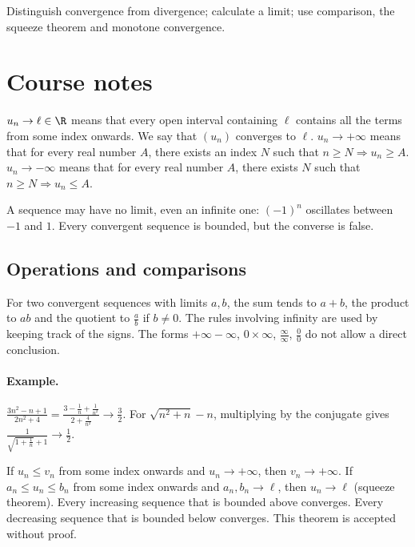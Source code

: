 \label{ch:2}


\begin{keypoint}[Objectives]Distinguish convergence from divergence; calculate a limit; use comparison, the squeeze theorem and monotone convergence.\end{keypoint}

\section{Course notes}
\begin{keypoint}[Definitions]
$u_n\to\ell\in\R$ means that every open interval containing $\ell$ contains all the terms from some index onwards. We say that $(u_n)$ converges to $\ell$.
$u_n\to+\infty$ means that for every real number $A$, there exists an index $N$ such that $n\ge N\Rightarrow u_n\ge A$. $u_n\to-\infty$ means that for every real number $A$, there exists $N$ such that $n\ge N\Rightarrow u_n\le A$.
\end{keypoint}
A sequence may have no limit, even an infinite one: $(-1)^n$ oscillates between $-1$ and $1$. Every convergent sequence is bounded, but the converse is false.
\subsection{Operations and comparisons}
For two convergent sequences with limits $a,b$, the sum tends to $a+b$, the product to $ab$ and the quotient to $\frac{a}{b}$ if $b\ne0$. The rules involving infinity are used by keeping track of the signs. The forms $+\infty-\infty$, $0\times\infty$, $\frac{\infty}{\infty}$, $\frac{0}{0}$ do not allow a direct conclusion.
\paragraph{Example.} $\frac{3n^2-n+1}{2n^2+4}=\frac{3-\frac{1}{n}+\frac{1}{n^2}}{2+\frac{4}{n^2}}\to\frac{3}{2}$. For $\sqrt{n^2+n}-n$, multiplying by the conjugate gives $\frac{1}{\sqrt{1+\frac{1}{n}}+1}\to\frac{1}{2}$.
\begin{keypoint}[Theorems]
If $u_n\le v_n$ from some index onwards and $u_n\to+\infty$, then $v_n\to+\infty$. If $a_n\le u_n\le b_n$ from some index onwards and $a_n,b_n\to\ell$, then $u_n\to\ell$ (squeeze theorem).
Every increasing sequence that is bounded above converges. Every decreasing sequence that is bounded below converges. This theorem is accepted without proof.
\end{keypoint}
